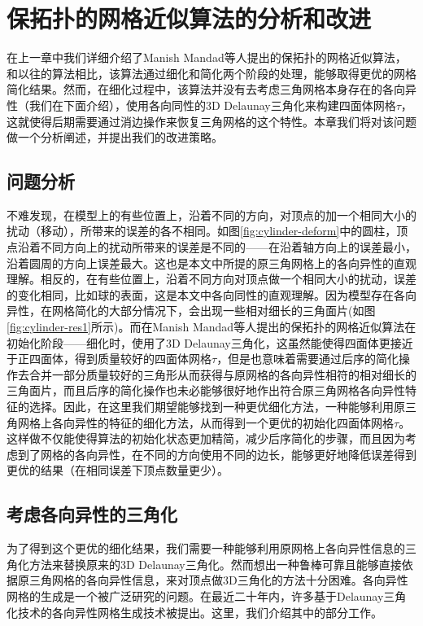 \chapter{保拓扑的网格近似算法的分析和改进}

在上一章中我们详细介绍了Manish Mandad等人提出的保拓扑的网格近似算法\cite{isotopic-appro}，和以往的算法相比，该算法通过细化和简化两个阶段的处理，能够取得更优的网格简化结果。然而，在细化过程中，该算法并没有去考虑三角网格本身存在的各向异性（我们在下面介绍），使用各向同性的3D Delaunay三角化来构建四面体网格$\tau$，这就使得后期需要通过消边操作来恢复三角网格的这个特性。本章我们将对该问题做一个分析阐述，并提出我们的改进策略。

\section{问题分析}
不难发现，在模型上的有些位置上，沿着不同的方向，对顶点的加一个相同大小的扰动（移动），所带来的误差的各不相同。如图\ref{fig:cylinder-deform}中的圆柱，顶点沿着不同方向上的扰动所带来的误差是不同的——在沿着轴方向上的误差最小，沿着圆周的方向上误差最大。这也是本文中所提的原三角网格上的各向异性的直观理解。相反的，在有些位置上，沿着不同方向对顶点做一个相同大小的扰动，误差的变化相同，比如球的表面，这是本文中各向同性的直观理解。因为模型存在各向异性，在网格简化的大部分情况下，会出现一些相对细长的三角面片(如图\ref{fig:cylinder-res1}所示)。而在Manish Mandad等人提出的保拓扑的网格近似算法在初始化阶段——细化时，使用了3D Delaunay三角化，这虽然能使得四面体更接近于正四面体，得到质量较好的四面体网格$\tau$，但是也意味着需要通过后序的简化操作去合并一部分质量较好的三角形从而获得与原网格的各向异性相符的相对细长的三角面片，而且后序的简化操作也未必能够很好地作出符合原三角网格各向异性特征的选择。因此，在这里我们期望能够找到一种更优细化方法，一种能够利用原三角网格上各向异性的特征的细化方法，从而得到一个更优的初始化四面体网格$\tau$。这样做不仅能使得算法的初始化状态更加精简，减少后序简化的步骤，而且因为考虑到了网格的各向异性，在不同的方向使用不同的边长，能够更好地降低误差得到更优的结果（在相同误差下顶点数量更少）。

\section{考虑各向异性的三角化}
为了得到这个更优的细化结果，我们需要一种能够利用原网格上各向异性信息的三角化方法来替换原来的3D Delaunay三角化。然而想出一种鲁棒可靠且能够直接依据原三角网格的各向异性信息，来对顶点做3D三角化的方法十分困难。各向异性网格的生成是一个被广泛研究的问题。在最近二十年内，许多基于Delaunay三角化技术的各向异性网格生成技术被提出。这里，我们介绍其中的部分工作。

